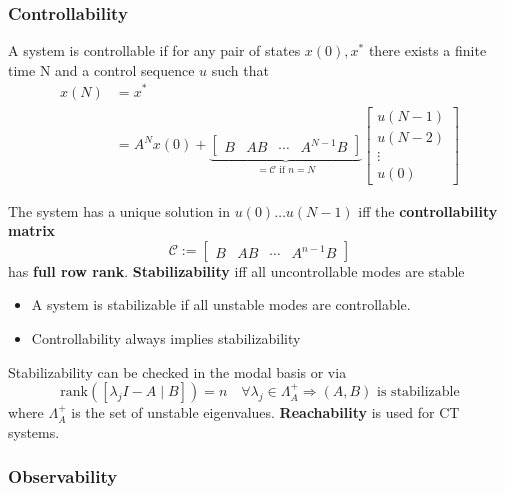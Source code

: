 \subsubsection{Controllability}

A system is controllable if for any pair of states $x(0), x^*$ there exists a finite time N and a control sequence $u$ such that
\noindent\begin{align*}
    x(N) & =x^*         \\
         & = A^N x(0) +
    \underbrace{\begin{bmatrix}
                        B & AB & \cdots & A^{N-1}B
                    \end{bmatrix}}_{=\mathcal{C}\text{ if }n=N}
    \begin{bmatrix}
        u(N-1) \\
        u(N-2) \\
        \vdots \\
        u(0)
    \end{bmatrix}
\end{align*}

\newpar{}
The system has a unique solution in $u(0)\dots u(N-1)$ iff the \textbf{controllability matrix}
\begin{equation*}
    \mathcal{C} :=
    \begin{bmatrix}
        B & AB & \cdots & A^{n-1} B
    \end{bmatrix}
\end{equation*}
has \textbf{full row rank}.
\newpar{}
\textbf{Stabilizability} iff all uncontrollable modes are stable
\begin{itemize}
    \item A system is stabilizable if all unstable modes are controllable.
    \item Controllability always implies stabilizability
\end{itemize}
Stabilizability can be checked in the modal basis or via
\noindent\begin{equation*}
    \text{rank}\left(\left[\lambda_{j}I-A\mid B\right]\right)=n\quad\forall\lambda_{j}\in\Lambda_{A}^{+}\Rightarrow(A,B)\text{ is stabilizable}
\end{equation*}
where $\Lambda_{A}^{+}$ is the set of unstable eigenvalues.
\newpar{}
\textbf{Reachability} is used for CT systems.

\subsubsection{Observability}

